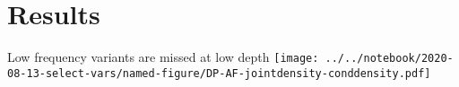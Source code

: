 \documentclass{beamer}
\begin{document}
\section{Results}


\begin{frame}{Low frequency variants are missed at low depth}
\texttt{[image: ../../notebook/2020-08-13-select-vars/named-figure/DP-AF-jointdensity-conddensity.pdf]}
\end{frame}

\begin{columns}[t]
\begin{column}{0.5\textwidth}

\end{column}

\begin{column}{0.5\textwidth}

\end{column}
\end{columns}
\end{document}
